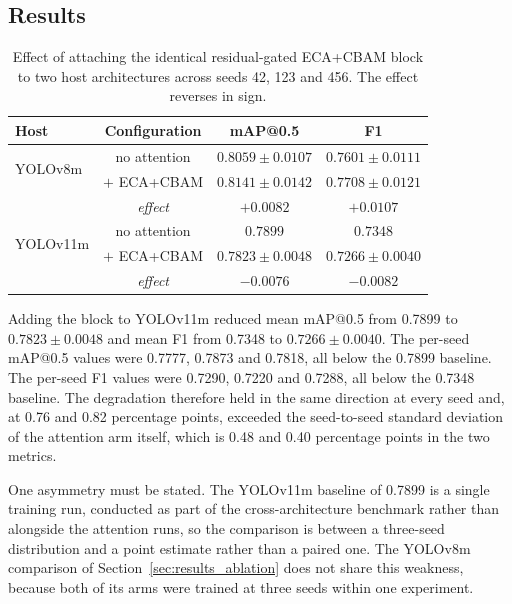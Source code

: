 \documentclass[MScCS]{uccthesis}
\begin{document}
\subsection{Results}

\begin{table}[tbp]
\centering
\small
\begin{tabular}{@{}lccc@{}}
\toprule
\textbf{Host} & \textbf{Configuration} & \textbf{mAP@0.5} & \textbf{F1} \\
\midrule
\multirow{2}{*}{YOLOv8m}
   & no attention   & $0.8059 \pm 0.0107$ & $0.7601 \pm 0.0111$ \\
   & $+$ ECA+CBAM   & $0.8141 \pm 0.0142$ & $0.7708 \pm 0.0121$ \\
\addlinespace[2pt]
   & \textit{effect} & \textit{$+0.0082$} & \textit{$+0.0107$} \\
\midrule
\multirow{2}{*}{YOLOv11m}
   & no attention   & $0.7899$ & $0.7348$ \\
   & $+$ ECA+CBAM   & $0.7823 \pm 0.0048$ & $0.7266 \pm 0.0040$ \\
\addlinespace[2pt]
   & \textit{effect} & \textit{$-0.0076$} & \textit{$-0.0082$} \\
\bottomrule
\end{tabular}
\caption[Effect of the identical attention block on two host architectures.]
        {\label{tab:yolov11m_saturation}Effect of attaching the identical
         residual-gated ECA+CBAM block to two host architectures across seeds
         42, 123 and 456. The effect reverses in sign.}
\end{table}

Adding the block to YOLOv11m reduced mean mAP@0.5 from 0.7899 to
$0.7823 \pm 0.0048$ and mean F1 from 0.7348 to $0.7266 \pm 0.0040$. The
per-seed mAP@0.5 values were 0.7777, 0.7873 and 0.7818, all below the 0.7899
baseline. The per-seed F1 values were 0.7290, 0.7220 and 0.7288, all below the
0.7348 baseline. The degradation therefore held in the same direction at every
seed and, at 0.76 and 0.82 percentage points, exceeded the seed-to-seed
standard deviation of the attention arm itself, which is 0.48 and 0.40
percentage points in the two metrics.

One asymmetry must be stated. The YOLOv11m baseline of 0.7899 is a single
training run, conducted as part of the cross-architecture benchmark rather than
alongside the attention runs, so the comparison is between a three-seed
distribution and a point estimate rather than a paired one. The YOLOv8m
comparison of Section~\ref{sec:results_ablation} does not share this weakness,
because both of its arms were trained at three seeds within one experiment.
\end{document}

